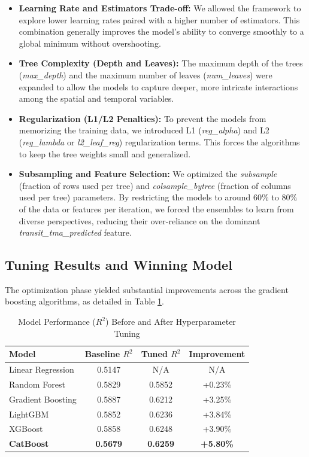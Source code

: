\begin{itemize}
    \item \textbf{Learning Rate and Estimators Trade-off:} We allowed the framework to explore lower learning rates paired with a higher number of estimators. This combination generally improves the model's ability to converge smoothly to a global minimum without overshooting.
    \item \textbf{Tree Complexity (Depth and Leaves):} The maximum depth of the trees (\textit{max\_depth}) and the maximum number of leaves (\textit{num\_leaves}) were expanded to allow the models to capture deeper, more intricate interactions among the spatial and temporal variables.
    \item \textbf{Regularization (L1/L2 Penalties):} To prevent the models from memorizing the training data, we introduced L1 (\textit{reg\_alpha}) and L2 (\textit{reg\_lambda} or \textit{l2\_leaf\_reg}) regularization terms. This forces the algorithms to keep the tree weights small and generalized.
    \item \textbf{Subsampling and Feature Selection:} We optimized the \textit{subsample} (fraction of rows used per tree) and \textit{colsample\_bytree} (fraction of columns used per tree) parameters. By restricting the models to around 60\% to 80\% of the data or features per iteration, we forced the ensembles to learn from diverse perspectives, reducing their over-reliance on the dominant \textit{transit\_tma\_predicted} feature.
\end{itemize}

\subsection{Tuning Results and Winning Model}

The optimization phase yielded substantial improvements across the gradient boosting algorithms, as detailed in Table \ref{tab:tuning_results}.

\begin{table}[htbp]
\caption{Model Performance ($R^2$) Before and After Hyperparameter Tuning}
\label{tab:tuning_results}
\centering
\begin{tabular}{lccc}
\hline
\textbf{Model} & \textbf{Baseline $R^2$} & \textbf{Tuned $R^2$} & \textbf{Improvement} \\
\hline
Linear Regression & 0.5147 & N/A & N/A \\
Random Forest & 0.5829 & 0.5852 & +0.23\% \\
Gradient Boosting & 0.5887 & 0.6212 & +3.25\% \\
LightGBM & 0.5852 & 0.6236 & +3.84\% \\
XGBoost & 0.5858 & 0.6248 & +3.90\% \\
\textbf{CatBoost} & \textbf{0.5679} & \textbf{0.6259} & \textbf{+5.80\%} \\
\hline
\end{tabular}
\end{table}

